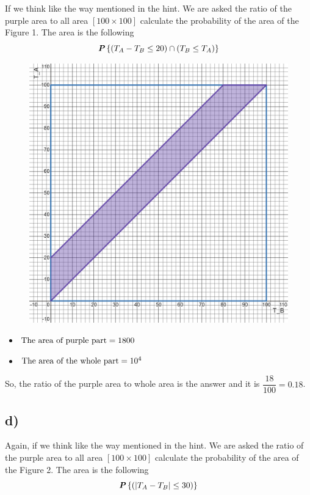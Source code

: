 


If we think like the way mentioned in the hint. We are asked the ratio of the purple area to all area $\left[ 100 \times 100 \right]$ calculate the probability of the area of the Figure 1. The area is the following
\begin{equation*}
  \textbf{\textit{P}}\left\{(T_A - T_B \leq 20) \cap (T_B \leq T_A)\right\}
\end{equation*}

\begin{figure}[ht!]
  \centering
  \includegraphics[width=.4\textwidth]{img/q2-c.png}
  \caption{}
\end{figure}

\begin{multicols}{2}
\begin{itemize}
  \item $\textnormal{The area of purple part} = 1800$
  \item $\textnormal{The area of the whole part} = 10^4$
\end{itemize}
\end{multicols}

So, the ratio of the purple area to whole area is the answer and it is $\dfrac{18}{100} = 0.18$.

\newpage
\subsection*{d)}

Again, if we think like the way mentioned in the hint. We are asked the ratio of the purple area to all area $\left[ 100 \times 100 \right]$ calculate the probability of the area of the Figure 2. The area is the following
\begin{equation*}
  \textbf{\textit{P}}\left\{(|T_A - T_B| \leq 30)\right\}
\end{equation*}

